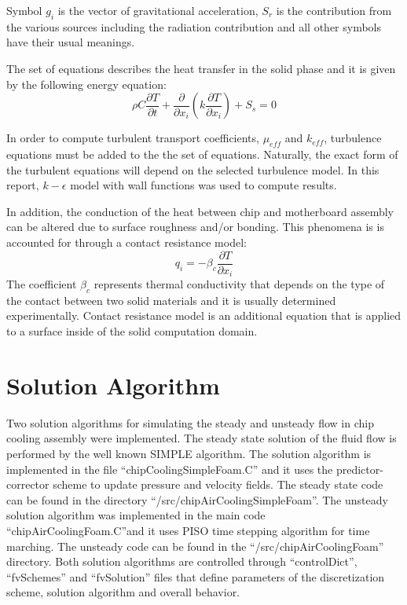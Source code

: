 Symbol $g_i$ is the vector of gravitational acceleration, $S_r$ is the
contribution from the various sources including the radiation
contribution and all other symbols have their usual meanings.

The set of equations describes the heat transfer in the solid phase
and it is given by the following energy equation:
\begin{equation}\label{eq:solid-energy}
\rho C \frac{\partial T}{\partial t} +
\frac{\partial}{\partial x_i}\left(k \frac{\partial T}{\partial x_i}\right) 
+ S_s = 0
\end{equation}

In order to compute turbulent transport coefficients, $\mu_{eff}$ and
$k_{eff}$, turbulence equations must be added to the the set of
equations. Naturally, the exact form of the turbulent equations will
depend on the selected turbulence model. In this report, $k-\epsilon$
model with wall functions was used to compute results.

In addition, the conduction of the heat between chip and motherboard
assembly can be altered due to surface roughness and/or bonding. This
phenomena is is accounted for through a contact resistance model:
\begin{equation}
  q_i = - \beta_c \frac{\partial T}{\partial x_i}
\end{equation}
The coefficient $\beta_c$ represents thermal conductivity that depends
on the type of the contact between two solid materials and it is
usually determined experimentally. Contact resistance model is an
additional equation that is applied to a surface inside of the solid
computation domain.

\section*{Solution Algorithm}

Two solution algorithms for simulating the steady and unsteady flow in
chip cooling assembly were implemented.  The steady state solution of
the fluid flow is performed by the well known SIMPLE algorithm. The
solution algorithm is implemented in the file
``chipCoolingSimpleFoam.C'' and it uses the predictor-corrector scheme
to update pressure and velocity fields. The steady state code can be
found in the directory ``/src/chipAirCoolingSimpleFoam''. The unsteady
solution algorithm was implemented in the main code
``chipAirCoolingFoam.C''and it uses PISO time stepping algorithm for
time marching. The unsteady code can be found in the
``/src/chipAirCoolingFoam'' directory. Both solution algorithms are
controlled through ``controlDict'', ``fvSchemes'' and ``fvSolution''
files that define parameters of the discretization scheme, solution
algorithm and overall behavior.

